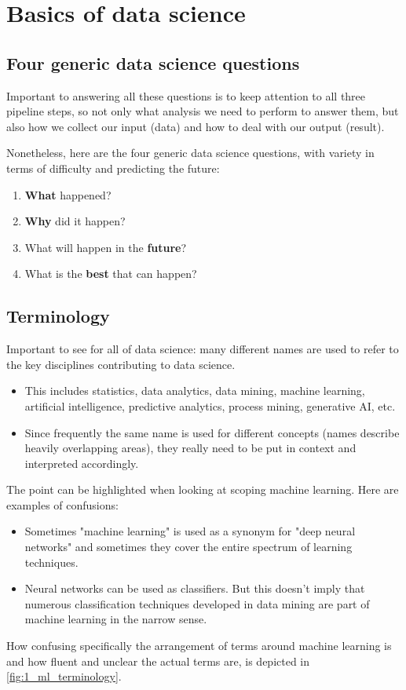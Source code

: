 \section{Basics of data science}
\setcounter{figure}{0}




\subsection*{Four generic data science questions}
Important to answering all these questions is to keep attention to all three pipeline steps, so not only what analysis we need to perform to answer them, but also how we collect our input (data) and how to deal with our output (result).

Nonetheless, here are the four generic data science questions, with variety in terms of difficulty and predicting the future:
\begin{enumerate}
  \item \textbf{What} happened?
  \item \textbf{Why} did it happen?
  \item What will happen in the \textbf{future}?
  \item What is the \textbf{best} that can happen?
\end{enumerate}






\subsection*{Terminology}
Important to see for all of data science: many different names are used to refer to the key disciplines contributing to data science.
\begin{itemize}
  \item This includes statistics, data analytics, data mining, machine learning, artificial intelligence, predictive analytics, process mining, generative AI, etc.
  \item Since frequently the same name is used for different concepts (names describe heavily overlapping areas), they really need to be put in context and interpreted accordingly.
\end{itemize}

The point can be highlighted when looking at scoping machine learning. Here are examples of confusions:
\begin{itemize}
  \item Sometimes "machine learning" is used as a synonym for "deep neural networks" and sometimes they cover the entire spectrum of learning techniques.
  \item Neural networks can be used as classifiers. But this doesn't imply that numerous classification techniques developed in data mining are part of machine learning in the narrow sense.
\end{itemize}
How confusing specifically the arrangement of terms around machine learning is and how fluent and unclear the actual terms are, is depicted in \ref{fig:1_ml_terminology}.

